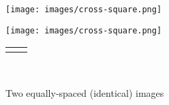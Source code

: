 \documentclass[10pt,]{article}
\theoremstyle{plain}
\theoremstyle{definition}
\theoremstyle{definition}
\theoremstyle{definition}
\theoremstyle{definition}
\theoremstyle{definition}
\theoremstyle{definition}
\numberwithin{equation}{section}
\newlength{\panelmax}
\begin{document}
\begin{figure}
\centering
{%
\setlength{\panelmax}{0pt}
\ifdefined\panelboxAimage\else\newsavebox{\panelboxAimage}\fi%
\begin{lrbox}{\panelboxAimage}
\texttt{[image: images/cross-square.png]}
\end{lrbox}
\ifdefined\phAimage\else\newlength{\phAimage}\fi%
\setlength{\phAimage}{\ht\panelboxAimage+\dp\panelboxAimage}
\settototalheight{\phAimage}{\usebox{\panelboxAimage}}
\setlength{\panelmax}{\maxof{\panelmax}{\phAimage}}
\ifdefined\panelboxBimage\else\newsavebox{\panelboxBimage}\fi%
\begin{lrbox}{\panelboxBimage}
\texttt{[image: images/cross-square.png]}
\end{lrbox}
\ifdefined\phBimage\else\newlength{\phBimage}\fi%
\setlength{\phBimage}{\ht\panelboxBimage+\dp\panelboxBimage}
\settototalheight{\phBimage}{\usebox{\panelboxBimage}}
\setlength{\panelmax}{\maxof{\panelmax}{\phBimage}}
\leavevmode%
\setlength{\tabcolsep}{0\linewidth}
\par\medskip\noindent
\begin{tabular}{@{}*{2}{c}@{}}
\begin{minipage}[c][\panelmax][t]{0.5\linewidth}\usebox{\panelboxAimage}\end{minipage}&
\begin{minipage}[c][\panelmax][t]{0.5\linewidth}\usebox{\panelboxBimage}\end{minipage}\end{tabular}\\
}%
\caption{Two equally-spaced (identical) images\label{figure-double-image}}
\end{figure}
\typeout{************************************************}
\typeout{************************************************}
\end{document}
